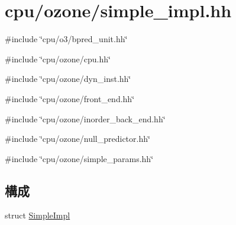 \hypertarget{simple__impl_8hh}{
\section{cpu/ozone/simple\_\-impl.hh}
\label{simple__impl_8hh}
}
{\ttfamily \#include \char`\"{}cpu/o3/bpred\_\-unit.hh\char`\"{}}\par
{\ttfamily \#include \char`\"{}cpu/ozone/cpu.hh\char`\"{}}\par
{\ttfamily \#include \char`\"{}cpu/ozone/dyn\_\-inst.hh\char`\"{}}\par
{\ttfamily \#include \char`\"{}cpu/ozone/front\_\-end.hh\char`\"{}}\par
{\ttfamily \#include \char`\"{}cpu/ozone/inorder\_\-back\_\-end.hh\char`\"{}}\par
{\ttfamily \#include \char`\"{}cpu/ozone/null\_\-predictor.hh\char`\"{}}\par
{\ttfamily \#include \char`\"{}cpu/ozone/simple\_\-params.hh\char`\"{}}\par
\subsection*{構成}
\begin{DoxyCompactItemize}
\item 
struct \hyperlink{structSimpleImpl}{SimpleImpl}
\end{DoxyCompactItemize}

